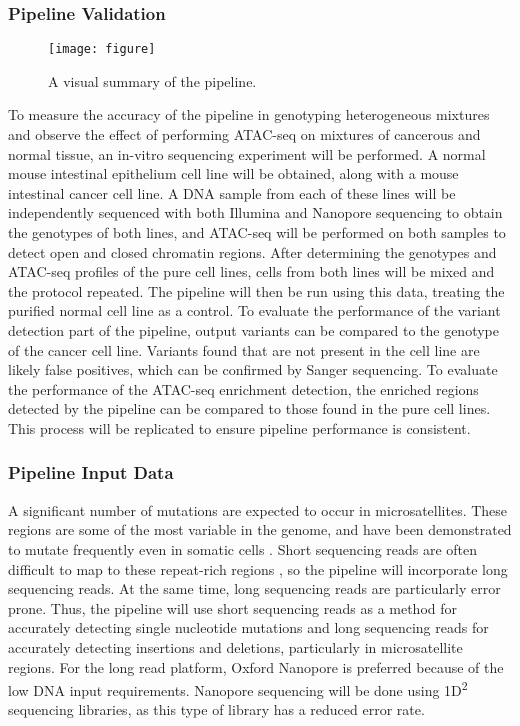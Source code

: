 \subsubsection{Pipeline Validation}

\begin{wrapfigure}{r}{0.66\linewidth}
\centering
\texttt{[image: figure]}
\caption{A visual summary of the pipeline.}
\label{fig:pipeline}
\end{wrapfigure}

To measure the accuracy of the pipeline in genotyping heterogeneous mixtures and observe the effect of performing ATAC-seq on mixtures of cancerous and normal tissue, an in-vitro sequencing experiment will be performed. A normal mouse intestinal epithelium cell line will be obtained, along with a mouse intestinal cancer cell line. A DNA sample from each of these lines will be independently sequenced with both Illumina and Nanopore sequencing to obtain the genotypes of both lines, and ATAC-seq will be performed on both samples to detect open and closed chromatin regions. After determining the genotypes and ATAC-seq profiles of the pure cell lines, cells from both lines will be mixed and the protocol repeated. The pipeline will then be run using this data, treating the purified normal cell line as a control. To evaluate the performance of the variant detection part of the pipeline, output variants can be compared to the genotype of the cancer cell line. Variants found that are not present in the cell line are likely false positives, which can be confirmed by Sanger sequencing. To evaluate the performance of the ATAC-seq enrichment detection, the enriched regions detected by the pipeline can be compared to those found in the pure cell lines.
This process will be replicated to ensure pipeline performance is consistent. 

\subsubsection{Pipeline Input Data} 
A significant number of mutations are expected to occur in microsatellites.
These regions are some of the most variable in the genome, and have been demonstrated to mutate frequently even in somatic cells \parencite{behjati_genome_2014}.
Short sequencing reads are often difficult to map to these repeat-rich regions \parencite{maruvka_analysis_2017}, so the pipeline will incorporate long sequencing reads. At the same time, long sequencing reads are particularly error prone. Thus, the pipeline will use short sequencing reads as a method for accurately detecting single nucleotide mutations and long sequencing reads for accurately detecting insertions and deletions, particularly in microsatellite regions.
For the long read platform, Oxford Nanopore is preferred because of the low DNA input requirements.
Nanopore sequencing will be done using 1D\textsuperscript{2} sequencing libraries, as this type of library has a reduced error rate.

